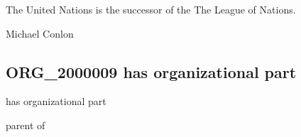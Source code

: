 \documentclass[letterpaper,10pt,english]{sphinxmanual}
\begin{document}
\begin{sphinxShadowBox}

\sphinxAtStartPar
{\hyperref[\detokenize{doc-ORG_0000001::doc}]{}}
\end{sphinxShadowBox}

\begin{sphinxShadowBox}

\sphinxAtStartPar
{\hyperref[\detokenize{doc-ORG_0000001::doc}]{}}
\end{sphinxShadowBox}

\begin{sphinxShadowBox}

\sphinxAtStartPar
The United Nations is the successor of the The League of Nations.
\end{sphinxShadowBox}

\begin{sphinxShadowBox}

\sphinxAtStartPar
Michael Conlon 
\end{sphinxShadowBox}
\begin{quote}

\ignorespaces \end{quote}


\subsection{ORG\_2000009 \sphinxhyphen{} has organizational part}
\label{\detokenize{doc-ORG_2000009:org-2000009-has-organizational-part}}\label{\detokenize{doc-ORG_2000009:index-0}}\label{\detokenize{doc-ORG_2000009::doc}}
\begin{sphinxShadowBox}

\sphinxAtStartPar
has organizational part
\end{sphinxShadowBox}

\begin{sphinxShadowBox}

\sphinxAtStartPar
parent of
\end{sphinxShadowBox}
\end{document}
